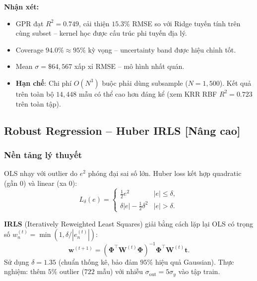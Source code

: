 \documentclass[12pt, a4paper]{article}
\begin{document}
\textbf{Nhận xét:}
\begin{itemize}
  \item GPR đạt $R^2 = 0.749$, cải thiện \textbf{$15.3\%$} RMSE so với
        Ridge tuyến tính trên cùng subset -- kernel học được cấu trúc
        phi tuyến địa lý.
  \item Coverage $94.0\% \approx 95\%$ kỳ vọng -- uncertainty band
        được hiệu chỉnh tốt.
  \item Mean $\sigma = \$64{,}567$ xấp xỉ RMSE -- mô hình nhất quán.
  \item \textbf{Hạn chế}: Chi phí $O(N^3)$ buộc phải dùng subsample
        ($N = 1{,}500$). Kết quả trên toàn bộ $14{,}448$ mẫu có thể
        cao hơn đáng kể (xem KRR RBF $R^2 = 0.723$ trên toàn tập).
\end{itemize}

\subsection{Robust Regression -- Huber IRLS [Nâng cao]}
\label{ssec:robust}

\subsubsection{Nền tảng lý thuyết}

OLS nhạy với outlier do $e^2$ phóng đại sai số lớn. Huber loss
kết hợp quadratic (gần 0) và linear (xa 0):
\begin{equation}
  L_\delta(e) = \begin{cases}
    \tfrac{1}{2}e^2          & |e| \leq \delta, \\
    \delta|e| - \tfrac{1}{2}\delta^2 & |e| > \delta.
  \end{cases}
  \label{eq:huber_loss}
\end{equation}

\textbf{IRLS} (Iteratively Reweighted Least Squares) giải bằng cách
lặp lại OLS có trọng số $w_n^{(t)} = \min(1, \delta/|e_n^{(t)}|)$:
\begin{equation}
  \mathbf{w}^{(t+1)} = (\boldsymbol{\Phi}^\top \mathbf{W}^{(t)} \boldsymbol{\Phi})^{-1}
                        \boldsymbol{\Phi}^\top \mathbf{W}^{(t)} \mathbf{t}.
  \label{eq:irls}
\end{equation}
Sử dụng $\delta = 1.35$ (chuẩn thống kê, bảo đảm $95\%$ hiệu quả Gaussian).
Thực nghiệm: thêm $5\%$ outlier ($722$ mẫu) với nhiễu $\sigma_{\text{out}} = 5\sigma_y$
vào tập train.
\end{document}
